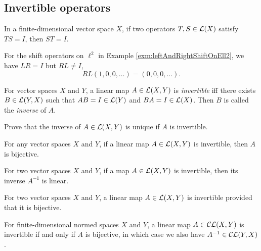 \subsection{Invertible operators}
\label{sec:invertible-operators}

\begin{lem}
  In a finite-dimensional vector space $X$, 
  if two operators $T,S\in {\cal L}(X)$ satisfy
  $TS = I$, then $ST = I$.
\end{lem}

\begin{exm}
  For the shift operators on $\ell^2$
  in Example \ref{exm:leftAndRightShiftOnEll2},
  we have $LR=I$ but $RL\ne I$,
  \begin{displaymath}
    RL(1,0,0,\ldots) = (0,0,0,\ldots).
  \end{displaymath}
\end{exm}

\begin{defn}
  \label{def:invertibleOps}
  For vector spaces $X$ and $Y$,
  a linear map \mbox{$A\in {\cal L}(X,Y)$} is \emph{invertible}
  iff there exists $B\in {\cal L}(Y,X)$
  such that $AB=I\in {\cal L}(Y)$
  and $BA=I\in {\cal L}(X)$. 
  Then $B$ is called the \emph{inverse} of $A$.
\end{defn}

\begin{exc}
  Prove that the inverse of $A\in {\cal L}(X,Y)$ is unique
  if $A$ is invertible.
\end{exc}

\begin{lem}
  \label{lem:invertibleImpliesBijective}
  For any vector spaces $X$ and $Y$, 
  if a linear map $A\in {\cal L}(X,Y)$ is invertible, 
  then $A$ is bijective.
\end{lem}

\begin{lem}
  \label{lem:invertibleCLmapIsLinear}
  For two vector spaces $X$ and $Y$, 
  if a map $A\in {\cal L}(X,Y)$ is invertible,
  then its inverse $A^{-1}$ is linear.
\end{lem}

\begin{lem}
  \label{lem:bijectiveImpliesInvertibleFiniteDim}
  For two vector spaces $X$ and $Y$, 
  a linear map $A\in {\cal L}(X,Y)$ is invertible
  provided that it is bijective.
\end{lem}

\begin{thm}
  For finite-dimensional normed spaces $X$ and $Y$,
  a linear map $A\in {\cal CL}(X,Y)$ is invertible
  if and only if $A$ is bijective,
  in which case we also have $A^{-1}\in {\cal CL}(Y,X)$. 
\end{thm}

